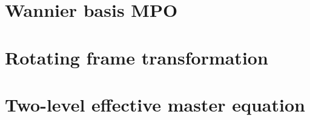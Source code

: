 \documentclass[a4paper,oneside,12pt]{hwthesis}
\newcommand*{\chappath}{../../include/chapters}
\newcommand*{\refpath}{../../include/refs}
\begin{document}


\chapter{\label{chp:dimmpo}Wannier basis MPO}



\chapter{\label{chp:rotframe}Rotating frame transformation}



\chapter{\label{chp:adelim}Two-level effective master equation}





\end{document}
